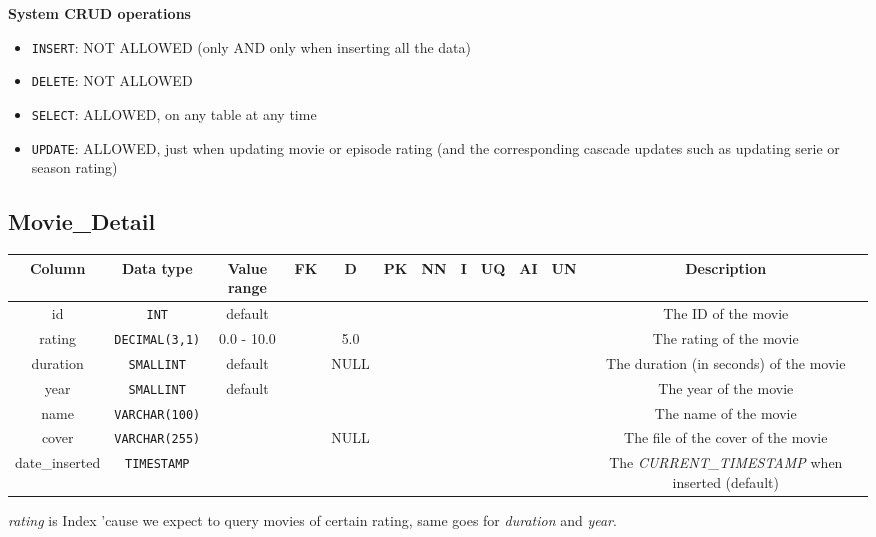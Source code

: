 \documentclass{article}
\newcommand{\dbtable}{\subsection}
\newcommand{\cmark}{\ding{51}}%
\newcommand{\mono}{\texttt}
\begin{document}
	\textbf{System CRUD operations}
	\begin{itemize}
		\item \mono{INSERT}: NOT ALLOWED (only AND only when inserting all the data)
		\item \mono{DELETE}: NOT ALLOWED
		\item \mono{SELECT}: ALLOWED, on any table at any time
		\item \mono{UPDATE}: ALLOWED, just when updating movie or episode rating (and the corresponding cascade updates such as updating serie or season rating)
	\end{itemize}
	
	\dbtable{Movie\_Detail}
	\begin{table}[h!]
		\centering
		\begin{tabular}{|c|c|c|c|c|c|c|c|c|c|c|c|}
			\toprule
			\bfseries Column & \bfseries Data type & \bfseries Value range & \bfseries FK & \bfseries D & \bfseries PK & \bfseries NN & \bfseries I & \bfseries UQ & \bfseries AI & \bfseries UN & \bfseries Description\\
			
			\midrule
			id & \mono{INT} & default & & & \cmark & \cmark & \cmark & \cmark & & \cmark & The ID of the movie\\

			\midrule
			rating & \mono{DECIMAL(3,1)} & 0.0 - 10.0 & & 5.0 & & \cmark & & & & & The rating of the movie\\

			\midrule
			duration & \mono{SMALLINT} & default & & NULL & & &  & & & \cmark & The duration (in seconds) of the movie\\

			\midrule
			year & \mono{SMALLINT} & default & & & & \cmark & & & & \cmark & The year of the movie\\

			\midrule
			name & \mono{VARCHAR(100)} & & & & & \cmark & & & & & The name of the movie\\
			
			\midrule
			cover & \mono{VARCHAR(255)} & & & NULL & & & & & & & The file of the cover of the movie\\
			
			\midrule
			date\_inserted & \mono{TIMESTAMP} & & & & & \cmark & & & & & The \textit{CURRENT\_TIMESTAMP} when inserted (default)\\
			
			\bottomrule			
		\end{tabular}
	\end{table}
	\textit{rating} is Index 'cause we expect to query movies of certain rating, same goes for \textit{duration} and \textit{year}.
	
\end{document}
